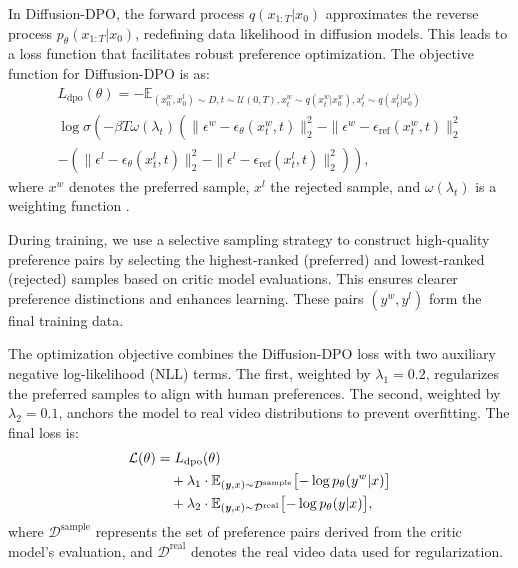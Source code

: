 In Diffusion-DPO, the forward process $q(x_{1:T}|x_0)$ approximates the reverse process $p_\theta(x_{1:T}|x_0)$, redefining data likelihood in diffusion models. This leads to a loss function that facilitates robust preference optimization. The objective function for Diffusion-DPO is  as:
\small
\begin{multline}
    L_{\text{dpo}}(\theta) = -\mathbb{E}_{
    (x^w_0, x^l_0) \sim D, t \sim \mathcal{U}(0,T), x^w_{t} \sim q(x^w_{t}|x^w_0), x^l_{t} \sim q(x^l_{t}|x^l_0)
    } \\
    \log\sigma \left( -\beta T \omega(\lambda_t) \left( \| \epsilon^w - \epsilon_\theta(x_{t}^w,t)\|^2_2 - \|\epsilon^w - \epsilon_{\text{ref}}(x_{t}^w,t)\|^2_2 \right. \right. \\
    - \left. \left( \| \epsilon^l - \epsilon_\theta(x_{t}^l,t)\|^2_2 - \|\epsilon^l - \epsilon_{\text{ref}}(x_{t}^l,t)\|^2_2 \right) \right),
\end{multline}
\normalsize
where $x^w$ denotes the preferred sample, $x^l$ the rejected sample, and $\omega(\lambda_t)$ is a weighting function \cite{ho2020denoisingdiffusionprobabilisticmodels, vaediffusion, rafailov2024directpreferenceoptimizationlanguage}.

During training, we use a selective sampling strategy to construct high-quality preference pairs by selecting the highest-ranked (preferred) and lowest-ranked (rejected) samples based on critic model evaluations. This ensures clearer preference distinctions and enhances learning. These pairs $(y^{w}, y^{l})$ form the final training data.

The optimization objective combines the Diffusion-DPO loss with two auxiliary negative log-likelihood (NLL) terms. The first, weighted by $\lambda_1{=}0.2$, regularizes the preferred samples to align with human preferences. The second, weighted by $\lambda_2{=}0.1$, anchors the model to real video distributions to prevent overfitting. The final loss is:
\small
\begin{equation}
\begin{aligned}
\mathcal{L}(\theta) &= L_{\text{dpo}}(\theta) \\
&\quad + \lambda_1 \cdot \mathbb{E}_{(\textbf{\textit{y}}, x) \sim \mathcal{D}^{\mathrm{sample}}} \bigl[-\log p_{\theta}(y^w|x)\bigr] \\
&\quad + \lambda_2 \cdot \mathbb{E}_{(\textbf{\textit{y}}, x) \sim \mathcal{D}^{\mathrm{real}}} \bigl[-\log p_{\theta}(y|x)\bigr],
\end{aligned}
\end{equation}
\normalsize
where $\mathcal{D}^{\mathrm{sample}}$ represents the set of preference pairs derived from the critic model’s evaluation, and $\mathcal{D}^{\mathrm{real}}$ denotes the real video data used for regularization.


